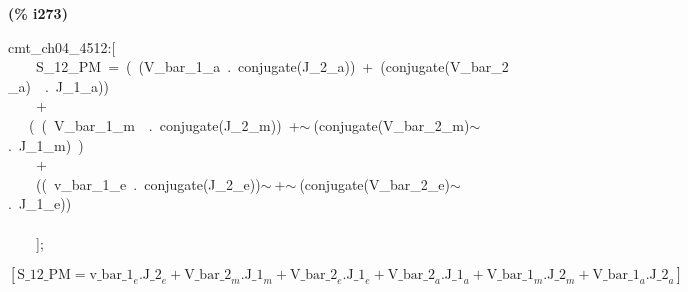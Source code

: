 \documentclass[fleqn]{article}
\begin{document}
\noindent
\begin{minipage}[t]{4.000000em}\color{red}\bfseries
(\% i273)	
\end{minipage}
\begin{minipage}[t]{\textwidth}\color{blue}
cmt\_ch04\_4512:[\\
\ \ \ \ S\_12\_PM\ =\ (\ (V\_bar\_1\_a\ .\ conjugate(J\_2\_a))\ +\ (conjugate(V\_bar\_2\_a)\ \ .\ J\_1\_a))\\
\ \ \ \ +\\
\ \ \ (\ (\ V\_bar\_1\_m\ \ .\ conjugate(J\_2\_m))\ +\ensuremath{\sim\ }(conjugate(V\_bar\_2\_m)\ensuremath{\sim\ }.\ J\_1\_m)\ )\\
\ \ \ \ +\\
\ \ \ \ ((\ v\_bar\_1\_e\ .\ conjugate(J\_2\_e))\ensuremath{\sim\ }+\ensuremath{\sim\ }(conjugate(V\_bar\_2\_e)\ensuremath{\sim\ }.\ J\_1\_e))\\
\\
\ \ \ \ ];
\end{minipage}
\[\displaystyle \tag{\% o273} 
\operatorname{[}\ensuremath{\mathrm{S\_ 12\_ PM}}={{\ensuremath{\mathrm{v\_ bar\_ 1}}}_e}\ensuremath{\mathrm{ . }}{{\ensuremath{\mathrm{J\_ 2}}}_e}+{{\ensuremath{\mathrm{V\_ bar\_ 2}}}_m}\ensuremath{\mathrm{ . }}{{\ensuremath{\mathrm{J\_ 1}}}_m}+{{\ensuremath{\mathrm{V\_ bar\_ 2}}}_e}\ensuremath{\mathrm{ . }}{{\ensuremath{\mathrm{J\_ 1}}}_e}+{{\ensuremath{\mathrm{V\_ bar\_ 2}}}_a}\ensuremath{\mathrm{ . }}{{\ensuremath{\mathrm{J\_ 1}}}_a}+{{\ensuremath{\mathrm{V\_ bar\_ 1}}}_m}\ensuremath{\mathrm{ . }}{{\ensuremath{\mathrm{J\_ 2}}}_m}+{{\ensuremath{\mathrm{V\_ bar\_ 1}}}_a}\ensuremath{\mathrm{ . }}{{\ensuremath{\mathrm{J\_ 2}}}_a}\operatorname{]}\mbox{}
\]
\end{document}
